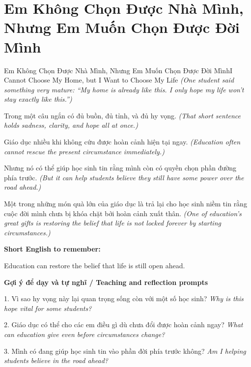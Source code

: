 \section{Em Không Chọn Được Nhà Mình, Nhưng Em Muốn Chọn Được Đời Mình}
\begin{truyen}{Em Không Chọn Được Nhà Mình, Nhưng Em Muốn Chọn Được Đời Mình}{I Cannot Choose My Home, but I Want to Choose My Life}
\textit{(One student said something very mature: “My home is already like this. I only hope my life won't stay exactly like this.”)}

Trong một câu ngắn có đủ buồn, đủ tỉnh, và đủ hy vọng.
\textit{(That short sentence holds sadness, clarity, and hope all at once.)}

Giáo dục nhiều khi không cứu được hoàn cảnh hiện tại ngay.
\textit{(Education often cannot rescue the present circumstance immediately.)}

Nhưng nó có thể giúp học sinh tin rằng mình còn có quyền chọn phần đường phía trước.
\textit{(But it can help students believe they still have some power over the road ahead.)}

\end{truyen}

\begin{baihoc}
Một trong những món quà lớn của giáo dục là trả lại cho học sinh niềm tin rằng cuộc đời mình chưa bị khóa chặt bởi hoàn cảnh xuất thân.
\textit{(One of education's great gifts is restoring the belief that life is not locked forever by starting circumstances.)}
\end{baihoc}

\begin{ghinhoanh}
\textbf{Short English to remember:}

Education can restore the belief that life is still open ahead.

\end{ghinhoanh}

\begin{tuhocnhanh}
\textbf{Gợi ý để dạy và tự nghĩ / Teaching and reflection prompts}

1. Vì sao hy vọng này lại quan trọng sống còn với một số học sinh? \textit{Why is this hope vital for some students?}

2. Giáo dục có thể cho các em điều gì dù chưa đổi được hoàn cảnh ngay? \textit{What can education give even before circumstances change?}

3. Mình có đang giúp học sinh tin vào phần đời phía trước không? \textit{Am I helping students believe in the road ahead?}
\end{tuhocnhanh}
